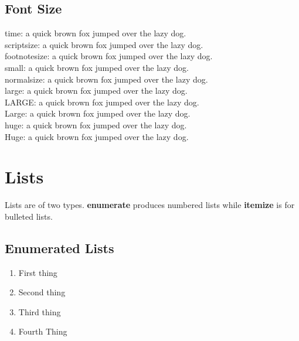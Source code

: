 \documentclass[a4paper, 12pt]{article}
\begin{document}
\pagebreak
\pagecolor{white}
\color{black}
\subsection{Font Size}
{\tiny time: a quick brown fox jumped over the lazy dog.}\\
{\scriptsize scriptsize: a quick brown fox jumped over the lazy dog.}\\
{\footnotesize footnotesize: a quick brown fox jumped over the lazy dog.}\\
{\small small: a quick brown fox jumped over the lazy dog.}\\
{\normalsize normalsize: a quick brown fox jumped over the lazy dog.}\\
{\large large: a quick brown fox jumped over the lazy dog.}\\
{\LARGE LARGE: a quick brown fox jumped over the lazy dog.}\\
{\Large Large: a quick brown fox jumped over the lazy dog.}\\
{\huge huge: a quick brown fox jumped over the lazy dog.}\\
{\Huge Huge: a quick brown fox jumped over the lazy dog.}\\


\section{Lists}
Lists are of two types. \textbf{enumerate} produces numbered lists while \textbf{itemize} is for bulleted lists.
\subsection{Enumerated Lists}
\begin{enumerate}
\item First thing
\item Second thing
\item Third thing
\item Fourth Thing
\end{enumerate}
\end{document}

